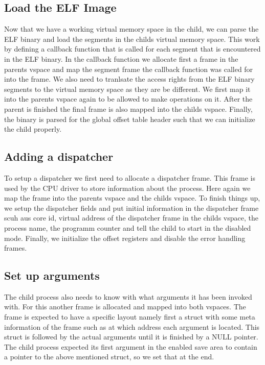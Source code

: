 \subsection{Load the ELF Image} 

Now that we have a working virtual memory space
in the child, we can parse the ELF binary and load the segments in the childs
virtual memory space. This work by defining a callback function that is called
for each segment that is encountered in the ELF binary.  In the callback
function we allocate first a frame in the parents vspace and map the segment
frame the callback function was called for into the frame. We also need to
tranlsate the access rights from the ELF binary segments to the virtual memory
space as they are be different. We first map it into the parents vspace again to
be allowed to make operations on it. After the parent is finished the final
frame is also mapped into the childs vspace.  Finally, the binary is parsed for
the global offset table header such that we can initialize the child properly.

\subsection{Adding a dispatcher} 

To setup a dispatcher we first need to allocate
a dispatcher frame. This frame is used by the CPU driver to store information
about the process.  Here again we map the frame into the parents vspace and the
childs vspace.  To finish things up, we setup the dispatcher fields and put
initial information in the dispatcher frame scuh aus core id, virtual address of
the dispatcher frame in the childs vspace, the process name, the programm
counter and tell the child to start in the disabled mode.  Finally, we
initialize the offset registers and disable the error handling frames.

\subsection{Set up arguments} 

The child process also needs to know with what
arguments it has been invoked with. For this another frame is allocated and
mapped into both vspaces.  The frame is expected to have a specific layout
namely first a struct with some meta information of the frame such as at which
address each argument is located.  This struct is followed by the actual
arguments until it is finished by a NULL pointer.  The child process expected
its first argument in the enabled save area to contain a pointer to the above
mentioned struct, so we set that at the end.

